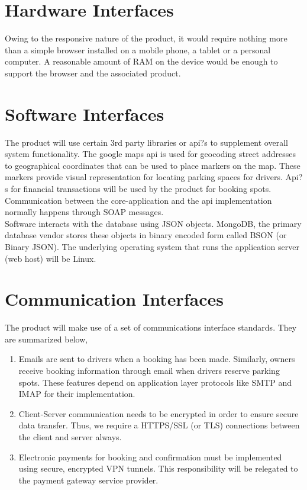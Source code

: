 \documentclass[12pt,a4paper]{report}
\begin{document}
\section{Hardware Interfaces}
Owing to the responsive nature of the product, it would require nothing more than a simple browser installed on a mobile phone, a tablet or a personal computer. A reasonable amount of RAM on the device would be enough to support the browser and the associated product.
\section{Software Interfaces}
The product will use certain 3rd party libraries or api?s to supplement overall system functionality. The google maps api is used for geocoding street addresses to geographical coordinates that can be used to place markers on the map. These markers provide visual representation for locating parking spaces for drivers. Api?s for financial transactions will be used by the product for booking spots. Communication between the core-application and the api implementation normally happens through SOAP messages.  \\
Software interacts with the database using JSON objects. MongoDB, the primary database vendor stores these objects in binary encoded form called BSON (or Binary JSON). The underlying operating system that runs the application server (web host) will be Linux. 
\section{Communication Interfaces}
The product will make use of a set of communications interface standards. They are summarized below,
\begin{enumerate}
	\renewcommand{\labelenumi}{{\textbf{\arabic{enumi}.}}}
	\item Emails are sent to drivers when a booking has been made. Similarly, owners receive booking information through email when drivers reserve parking spots. These features depend on application layer protocols like SMTP and IMAP for their implementation.
	\item Client-Server communication needs to be encrypted in order to ensure secure data transfer. Thus, we require a HTTPS/SSL (or TLS) connections between the client and server always.
	\item Electronic payments for booking and confirmation must be implemented using secure, encrypted VPN tunnels. This responsibility will be relegated to the payment gateway service provider.  
\end{enumerate}
\end{document}
